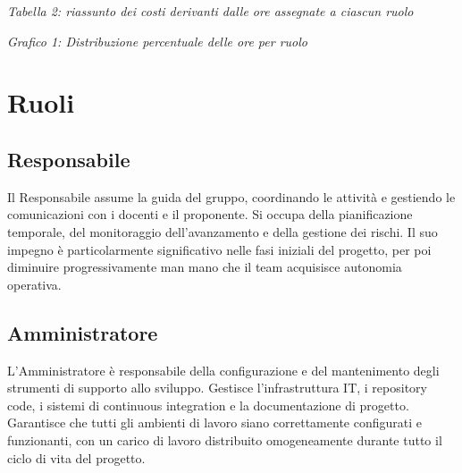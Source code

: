 \documentclass[a4paper,11pt]{article}
\begin{document}
\begin{center}
\textit{Tabella 2: riassunto dei costi derivanti dalle ore assegnate a ciascun ruolo}
\end{center}

\vspace{1cm}

\begin{center}
\end{center}

\begin{center}
\textit{Grafico 1: Distribuzione percentuale delle ore per ruolo}
\end{center}

\newpage

\section{Ruoli}

\subsection{Responsabile}
Il Responsabile assume la guida del gruppo, coordinando le attività e gestiendo le comunicazioni con i docenti e il proponente. Si occupa della pianificazione temporale, del monitoraggio dell'avanzamento e della gestione dei rischi. Il suo impegno è particolarmente significativo nelle fasi iniziali del progetto, per poi diminuire progressivamente man mano che il team acquisisce autonomia operativa.

\subsection{Amministratore}
L'Amministratore è responsabile della configurazione e del mantenimento degli strumenti di supporto allo sviluppo. Gestisce l'infrastruttura IT, i repository code, i sistemi di continuous integration e la documentazione di progetto. Garantisce che tutti gli ambienti di lavoro siano correttamente configurati e funzionanti, con un carico di lavoro distribuito omogeneamente durante tutto il ciclo di vita del progetto.
\end{document}
